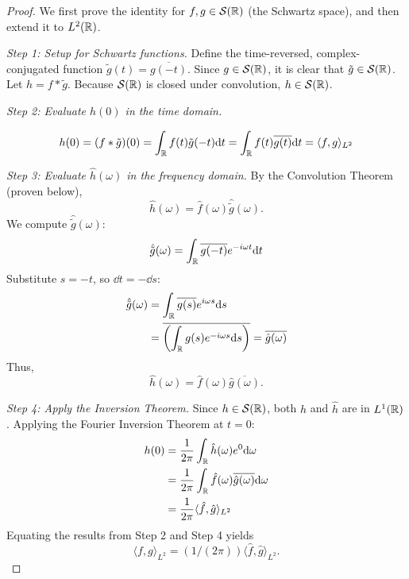 \begin{proof}
We first prove the identity for $f, g \in \mathcal{S}(\mathbb{R})$ (the Schwartz space), and then extend it to $L^2(\mathbb{R})$.

\textit{Step 1: Setup for Schwartz functions.}
Define the time-reversed, complex-conjugated function $\tilde{g}(t) = \overline{g(-t)}$. Since $g \in \mathcal{S}(\mathbb{R})$, it is clear that $\tilde{g} \in \mathcal{S}(\mathbb{R})$. Let $h = f * \tilde{g}$. Because $\mathcal{S}(\mathbb{R})$ is closed under convolution, $h \in \mathcal{S}(\mathbb{R})$.

\textit{Step 2: Evaluate $h(0)$ in the time domain.}

\begin{equation}
h(0) = (f * \tilde{g})(0) = \int_{\mathbb{R}} f(t) \tilde{g}(-t) \mathrm{d} t = \int_{\mathbb{R}} f(t) \overline{g(t)} \mathrm{d} t = \langle f, g \rangle_{L^2}
\end{equation}

\textit{Step 3: Evaluate $\hat{h}(\omega)$ in the frequency domain.}
By the Convolution Theorem (proven below),
\[
\hat{h}(\omega) = \hat{f}(\omega) \hat{\tilde{g}}(\omega).
\]
We compute $\hat{\tilde{g}}(\omega)$:
\begin{equation}
\hat{\tilde{g}}(\omega) = \int_{\mathbb{R}} \overline{g(-t)} e^{-i\omega t} \mathrm{d} t
\end{equation}
Substitute $s = -t$, so $\dd t = -\dd s$:
\begin{equation}
\begin{aligned}
    \hat{\tilde{g}}(\omega)
    &= \int_{\mathbb{R}} \overline{g(s)} e^{i\omega s} \mathrm{d} s \\
    &= \overline{ \left( \int_{\mathbb{R}} g(s) e^{-i\omega s} \mathrm{d} s \right) }
    = \overline{\hat{g}(\omega)}
    \end{aligned}
\end{equation}
Thus,
\[
\hat{h}(\omega) = \hat{f}(\omega) \overline{\hat{g}(\omega)}.
\]

\textit{Step 4: Apply the Inversion Theorem.}
Since $h \in \mathcal{S}(\mathbb{R})$, both $h$ and $\hat{h}$ are in $L^1(\mathbb{R})$. Applying the Fourier Inversion Theorem at $t=0$:
\begin{equation}
\begin{aligned}
h(0) &= \frac{1}{2\pi} \int_{\mathbb{R}} \hat{h}(\omega) e^{0} \mathrm{d} \omega \\
    &= \frac{1}{2\pi} \int_{\mathbb{R}} \hat{f}(\omega) \overline{\hat{g}(\omega)} \mathrm{d} \omega \\
    &= \frac{1}{2\pi} \langle \hat{f}, \hat{g} \rangle_{L^2}
    \end{aligned}
\end{equation}
Equating the results from Step 2 and Step 4 yields
\[
\langle f, g \rangle_{L^2} = (1/(2\pi)) \langle \hat{f}, \hat{g} \rangle_{L^2}.
\]


\end{proof}

